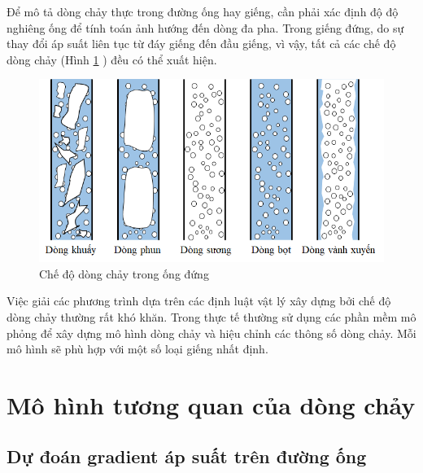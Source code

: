 \documentclass[12pt,a4paper]{report}
\begin{document}
Để mô tả dòng chảy thực trong đường ống hay giếng, cần phải xác định độ độ nghiêng ống để tính toán ảnh hướng đến dòng đa pha. Trong giếng đứng, do sự thay đổi áp suất liên tục từ đáy giếng đến đầu giếng, vì vậy, tất cả các chế độ dòng chảy (Hình \ref{fig:vertical_flow_regime} \cite{jansen2004modelling}) đều có thể xuất hiện.\\
	\begin{figure}[h]
		\centering
		\includegraphics[scale=0.75]{Fig/vertical_flow_regime.png}
		\caption{Chế độ dòng chảy trong ống đứng}
		\label{fig:vertical_flow_regime}
	\end{figure}
Việc giải các phương trình dựa trên các định luật vật lý xây dựng bởi chế độ dòng chảy thường rất khó khăn. Trong thực tế thường sử dụng các phần mềm mô phỏng để xây dựng mô hình dòng chảy và hiệu chỉnh các thông số dòng chảy. Mỗi mô hình sẽ phù hợp với một số loại giếng nhất định.

\section{Mô hình tương quan của dòng chảy}
\subsection{Dự đoán gradient áp suất trên đường ống}
\end{document}
